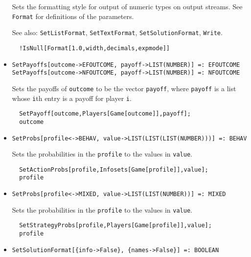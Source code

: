 \begin{itemize}
\bd Sets the formatting style for output of numeric types on output
streams.  See \verb+Format+ for definitions of the parameters.
\item [See also:] \verb+SetListFormat+, \verb+SetTextFormat+, 
\verb+SetSolutionFormat+, \verb+Write+.
\begin{verbatim}
  !IsNull[Format[1.0,width,decimals,expmode]]
\end{verbatim} 
\ed

\item{}
\protect \large \begin{verbatim}
SetPayoffs[outcome->EFOUTCOME, payoff->LIST(NUMBER)] =: EFOUTCOME 
SetPayoffs[outcome->NFOUTCOME, payoff->LIST(NUMBER)] =: NFOUTCOME 
\end{verbatim}\normalsize
 
\bd 

Sets the payoffs of \verb+outcome+ to be the vector \verb+payoff+,
where \verb+payoff+ is a list whose \verb+i+th entry is a payoff for
player \verb+i+.
\begin{verbatim}
  SetPayoff[outcome,Players[Game[outcome]],payoff];
  outcome
\end{verbatim} 
\ed

\item{}
\protect \large \begin{verbatim}
SetProbs[profile<->BEHAV, value->LIST(LIST(LIST(NUMBER)))] =: BEHAV 
\end{verbatim}\normalsize

\bd 
Sets the probabilities in the \verb+profile+ to the values in
\verb+value+.  
\begin{verbatim}
  SetActionProbs[profile,Infosets[Game[profile]],value];
  profile
\end{verbatim} 
\ed

\item{}
\protect \large \begin{verbatim}
SetProbs[profile<->MIXED, value->LIST(LIST(NUMBER))] =: MIXED 
\end{verbatim}\normalsize

\bd 
Sets the probabilities in the \verb+profile+ to the values in
\verb+value+.  
\begin{verbatim}
  SetStrategyProbs[profile,Players[Game[profile]],value];
  profile
\end{verbatim} 
\ed

\item{}
\protect \large \begin{verbatim}
SetSolutionFormat[{info->False}, {names->False}] =: BOOLEAN 
\end{verbatim}\normalsize


\end{itemize}
